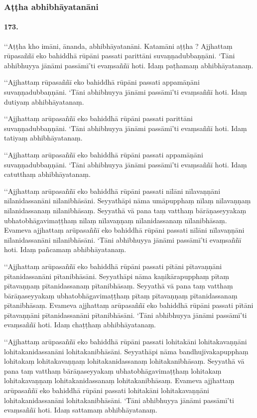 \subsubsection{Aṭṭha abhibhāyatanāni}

\paragraph{173.} ‘‘Aṭṭha kho imāni, ānanda, abhibhāyatanāni. Katamāni aṭṭha ? Ajjhattaṃ rūpasaññī eko bahiddhā rūpāni passati parittāni suvaṇṇadubbaṇṇāni. ‘Tāni abhibhuyya jānāmi passāmī’ti evaṃsaññī hoti. Idaṃ paṭhamaṃ abhibhāyatanaṃ.

‘‘Ajjhattaṃ rūpasaññī eko bahiddhā rūpāni passati appamāṇāni suvaṇṇadubbaṇṇāni. ‘Tāni abhibhuyya jānāmi passāmī’ti evaṃsaññī hoti. Idaṃ dutiyaṃ abhibhāyatanaṃ.

‘‘Ajjhattaṃ arūpasaññī eko bahiddhā rūpāni passati parittāni suvaṇṇadubbaṇṇāni. ‘Tāni abhibhuyya jānāmi passāmī’ti evaṃsaññī hoti. Idaṃ tatiyaṃ abhibhāyatanaṃ.

‘‘Ajjhattaṃ arūpasaññī eko bahiddhā rūpāni passati appamāṇāni suvaṇṇadubbaṇṇāni. ‘Tāni abhibhuyya jānāmi passāmī’ti evaṃsaññī hoti. Idaṃ catutthaṃ abhibhāyatanaṃ.

‘‘Ajjhattaṃ arūpasaññī eko bahiddhā rūpāni passati nīlāni nīlavaṇṇāni nīlanidassanāni nīlanibhāsāni. Seyyathāpi nāma umāpupphaṃ nīlaṃ nīlavaṇṇaṃ nīlanidassanaṃ nīlanibhāsaṃ. Seyyathā vā pana taṃ vatthaṃ bārāṇaseyyakaṃ ubhatobhāgavimaṭṭhaṃ nīlaṃ nīlavaṇṇaṃ nīlanidassanaṃ nīlanibhāsaṃ. Evameva ajjhattaṃ arūpasaññī eko bahiddhā rūpāni passati nīlāni nīlavaṇṇāni nīlanidassanāni nīlanibhāsāni. ‘Tāni abhibhuyya jānāmi passāmī’ti evaṃsaññī hoti. Idaṃ pañcamaṃ abhibhāyatanaṃ.

‘‘Ajjhattaṃ arūpasaññī eko bahiddhā rūpāni passati pītāni pītavaṇṇāni pītanidassanāni pītanibhāsāni. Seyyathāpi nāma kaṇikārapupphaṃ pītaṃ pītavaṇṇaṃ pītanidassanaṃ pītanibhāsaṃ. Seyyathā vā pana taṃ vatthaṃ bārāṇaseyyakaṃ ubhatobhāgavimaṭṭhaṃ pītaṃ pītavaṇṇaṃ pītanidassanaṃ pītanibhāsaṃ. Evameva ajjhattaṃ arūpasaññī eko bahiddhā rūpāni passati pītāni pītavaṇṇāni pītanidassanāni pītanibhāsāni. ‘Tāni abhibhuyya jānāmi passāmī’ti evaṃsaññī hoti. Idaṃ chaṭṭhaṃ abhibhāyatanaṃ.

‘‘Ajjhattaṃ arūpasaññī eko bahiddhā rūpāni passati lohitakāni lohitakavaṇṇāni lohitakanidassanāni lohitakanibhāsāni. Seyyathāpi nāma bandhujīvakapupphaṃ lohitakaṃ lohitakavaṇṇaṃ lohitakanidassanaṃ lohitakanibhāsaṃ. Seyyathā vā pana taṃ vatthaṃ bārāṇaseyyakaṃ ubhatobhāgavimaṭṭhaṃ lohitakaṃ lohitakavaṇṇaṃ lohitakanidassanaṃ lohitakanibhāsaṃ. Evameva ajjhattaṃ arūpasaññī eko bahiddhā rūpāni passati lohitakāni lohitakavaṇṇāni lohitakanidassanāni lohitakanibhāsāni. ‘Tāni abhibhuyya jānāmi passāmī’ti evaṃsaññī hoti. Idaṃ sattamaṃ abhibhāyatanaṃ.

